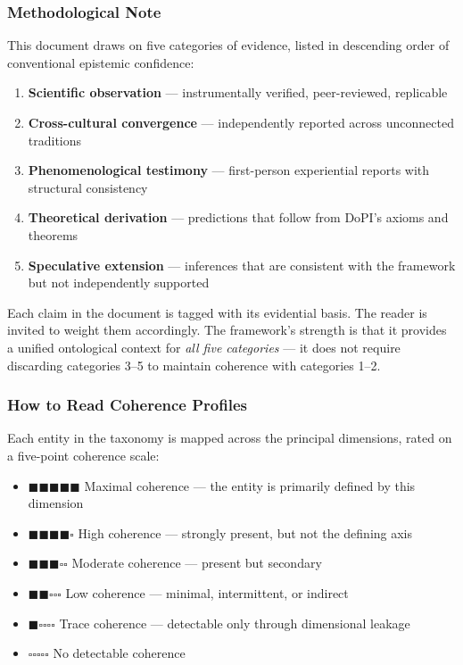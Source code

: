 \subsubsection*{Methodological Note}


This document draws on five categories of evidence, listed in descending order of conventional epistemic confidence:


\begin{enumerate}[nosep,leftmargin=*]
  \item \textbf{Scientific observation} — instrumentally verified, peer-reviewed, replicable
  \item \textbf{Cross-cultural convergence} — independently reported across unconnected traditions
  \item \textbf{Phenomenological testimony} — first-person experiential reports with structural consistency
  \item \textbf{Theoretical derivation} — predictions that follow from DoPI's axioms and theorems
  \item \textbf{Speculative extension} — inferences that are consistent with the framework but not independently supported
\end{enumerate}


Each claim in the document is tagged with its evidential basis. The reader is invited to weight them accordingly. The framework's strength is that it provides a unified ontological context for \textit{all five categories} — it does not require discarding categories 3–5 to maintain coherence with categories 1–2.


\subsubsection*{How to Read Coherence Profiles}


Each entity in the taxonomy is mapped across the principal dimensions, rated on a five-point coherence scale:


\begin{itemize}[nosep,leftmargin=*]
  \item \textbf{$\blacksquare$$\blacksquare$$\blacksquare$$\blacksquare$$\blacksquare$} Maximal coherence — the entity is primarily defined by this dimension
  \item \textbf{$\blacksquare$$\blacksquare$$\blacksquare$$\blacksquare$$\square$} High coherence — strongly present, but not the defining axis
  \item \textbf{$\blacksquare$$\blacksquare$$\blacksquare$$\square$$\square$} Moderate coherence — present but secondary
  \item \textbf{$\blacksquare$$\blacksquare$$\square$$\square$$\square$} Low coherence — minimal, intermittent, or indirect
  \item \textbf{$\blacksquare$$\square$$\square$$\square$$\square$} Trace coherence — detectable only through dimensional leakage
  \item \textbf{$\square$$\square$$\square$$\square$$\square$} No detectable coherence
\end{itemize}


